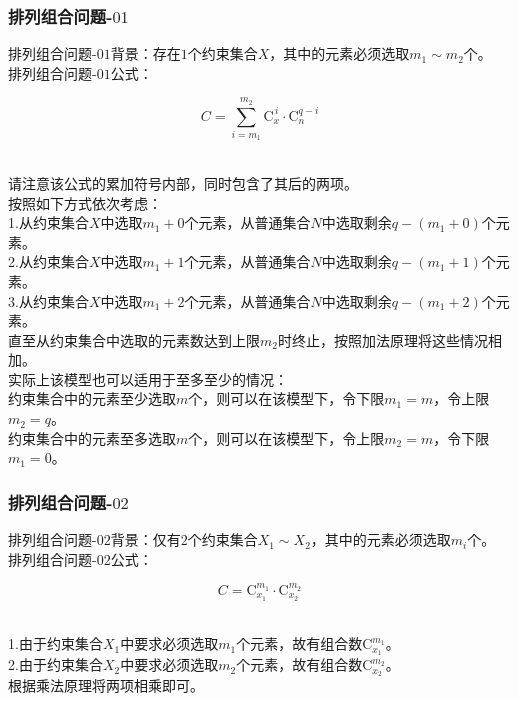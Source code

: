 \documentclass[UTF8]{ctexart}
\newcommand{\rnum}[1]{\uppercase\expandafter{\romannumeral #1\relax}}
\begin{document}
\subsubsection{排列组合问题\rnum{2}-$01$}
    排列组合问题\rnum{2}-$01$背景：存在$1$个约束集合$X$，其中的元素必须选取$m_1\sim m_2$个。\\[3mm]
    排列组合问题\rnum{2}-$01$公式：
    \begin{large}
        \begin{equation*}
            C=\sum_{i=m_1}^{m_2}\mathrm{C}_{x}^{\,i}\cdot\mathrm{C}_{n}^{q-i}
        \end{equation*}
    \end{large}\\
    请注意该公式的累加符号内部，同时包含了其后的两项。\\[3mm]
    按照如下方式依次考虑：\\[3mm]
    1.从约束集合$X$中选取$m_1+0$个元素，从普通集合$N$中选取剩余$q-(m_1+0)$个元素。\\[3mm]
    2.从约束集合$X$中选取$m_1+1$个元素，从普通集合$N$中选取剩余$q-(m_1+1)$个元素。\\[3mm]
    3.从约束集合$X$中选取$m_1+2$个元素，从普通集合$N$中选取剩余$q-(m_1+2)$个元素。\\[3mm]
    直至从约束集合中选取的元素数达到上限$m_2$时终止，按照加法原理将这些情况相加。\\[5mm]
    实际上该模型也可以适用于至多至少的情况：\\[3mm]
    约束集合中的元素至少选取$m$个，则可以在该模型下，令下限$m_1=m$，令上限$m_2=q$。\\[3mm]
    约束集合中的元素至多选取$m$个，则可以在该模型下，令上限$m_2=m$，令下限$m_1=0$。

\newpage

\subsubsection{排列组合问题\rnum{2}-$02$}
    排列组合问题\rnum{2}-$02$背景：仅有$2$个约束集合$X_1\sim X_2$，其中的元素必须选取$m_i$个。\\[3mm]
    排列组合问题\rnum{2}-$02$公式：
    \begin{large}
        \begin{equation*}
            C=\mathrm{C}_{x_1}^{m_1}\cdot\mathrm{C}_{x_2}^{m_2}
        \end{equation*}
    \end{large}\\
    1.由于约束集合$X_1$中要求必须选取$m_1$个元素，故有组合数$\mathrm{C}_{x_1}^{m_1}$。\\[3mm]
    2.由于约束集合$X_2$中要求必须选取$m_2$个元素，故有组合数$\mathrm{C}_{x_2}^{m_2}$。\\[3mm]
    根据乘法原理将两项相乘即可。\\
\end{document}
